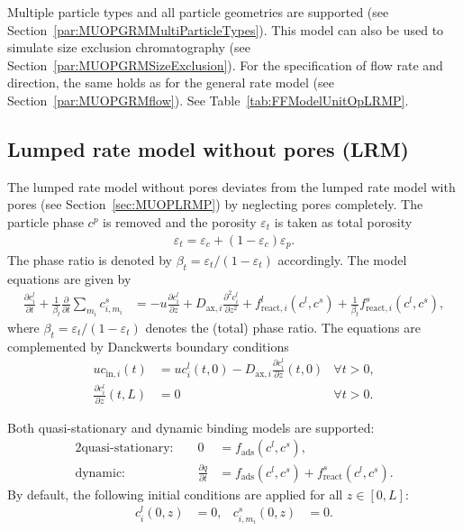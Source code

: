 Multiple particle types and all particle geometries are supported (see Section~\ref{par:MUOPGRMMultiParticleTypes}).
This model can also be used to simulate size exclusion chromatography (see Section~\ref{par:MUOPGRMSizeExclusion}).
For the specification of flow rate and direction, the same holds as for the general rate model (see Section~\ref{par:MUOPGRMflow}).
See Table~\ref{tab:FFModelUnitOpLRMP}.

\subsection{Lumped rate model without pores (LRM)}\label{sec:MUOPLRM}

The lumped rate model without pores  \cite{Guiochon2006,Felinger2004} deviates from the lumped rate model with pores (see Section~\ref{sec:MUOPLRMP}) by neglecting pores completely.
The particle phase $c^p$ is removed and the porosity $\varepsilon_t$ is taken as total porosity
\begin{align}
	\varepsilon_t = \varepsilon_c + \left( 1 - \varepsilon_c \right) \varepsilon_p. \label{eq:TotalPorosity}
\end{align}
The phase ratio is denoted by $\beta_t = \varepsilon_t / (1 - \varepsilon_t)$ accordingly.
The model equations are given by
\begin{align}
	\frac{\partial c^l_i}{\partial t} + \frac{1}{\beta_t} \frac{\partial}{\partial t} \sum_{m_i} c^s_{i,m_i} &= -u \frac{\partial c^l_i}{\partial z} + D_{\text{ax},i} \frac{\partial^2 c^l_i}{\partial z^2} + f_{\text{react},i}^l\left( c^l, c^s \right) + \frac{1}{\beta_t} f_{\text{react},i}^s\left( c^l, c^s \right),
\end{align}
where $\beta_t = \varepsilon_t / (1 - \varepsilon_t)$ denotes the (total) phase ratio.
The equations are complemented by Danckwerts boundary conditions \cite{Danckwerts1953}
\begin{align*}
	u c_{\text{in},i}(t) &= u c^l_i(t,0) - D_{\text{ax},i} \frac{\partial c^l_i}{\partial z}(t, 0) & \forall t > 0,\\
	\frac{\partial c^l_i}{\partial z}(t, L) &= 0 & \forall t > 0.
\end{align*}

Both quasi-stationary and dynamic binding models are supported:
\begin{alignat*}{2}
	\text{quasi-stationary: }& & 0 &= f_{\text{ads}}\left( c^l, c^s\right), \\
	\text{dynamic: }& & \frac{\partial q}{\partial t} &= f_{\text{ads}}\left( c^l, c^s\right) + f_{\text{react}}^s\left( c^l, c^s \right).
\end{alignat*}
By default, the following initial conditions are applied for all $z \in [0,L]$:
\begin{align}
	c^l_i(0, z) &= 0, & c^s_{i,m_i}(0,z) &= 0.
\end{align}

